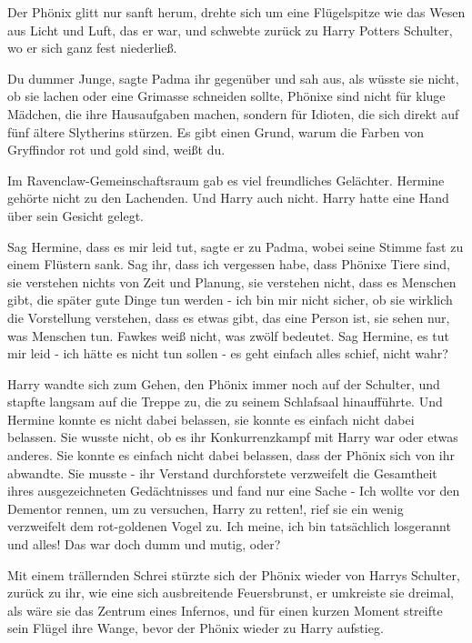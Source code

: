 Der Phönix glitt nur sanft herum, drehte sich um eine Flügelspitze wie das Wesen
aus Licht und Luft, das er war, und schwebte zurück zu Harry Potters Schulter,
wo er sich ganz fest niederließ.

\glqq{}Du dummer Junge\grqq{}, sagte Padma ihr gegenüber und sah aus, als wüsste
sie nicht, ob sie lachen oder eine Grimasse schneiden sollte, \glqq{}Phönixe sind
nicht für kluge Mädchen, die ihre Hausaufgaben machen, sondern für Idioten, die
sich direkt auf fünf ältere Slytherins stürzen. Es gibt einen Grund, warum die
Farben von Gryffindor rot und gold sind, weißt du.\grqq{}

Im Ravenclaw-Gemeinschaftsraum gab es viel freundliches Gelächter. Hermine
gehörte nicht zu den Lachenden. Und Harry auch nicht. Harry hatte eine Hand über
sein Gesicht gelegt.

\glqq{}Sag Hermine, dass es mir leid tut\grqq{}, sagte er zu Padma, wobei seine
Stimme fast zu einem Flüstern sank. \glqq{}Sag ihr, dass ich vergessen habe, dass
Phönixe Tiere sind, sie verstehen nichts von Zeit und Planung, sie verstehen
nicht, dass es Menschen gibt, die später gute Dinge tun werden - ich bin mir
nicht sicher, ob sie wirklich die Vorstellung verstehen, dass es etwas gibt, das
eine Person ist, sie sehen nur, was Menschen tun. Fawkes weiß nicht, was zwölf
bedeutet. Sag Hermine, es tut mir leid - ich hätte es nicht tun sollen - es geht
einfach alles schief, nicht wahr?\grqq{}

Harry wandte sich zum Gehen, den Phönix immer noch auf der Schulter, und stapfte
langsam auf die Treppe zu, die zu seinem Schlafsaal hinaufführte. Und Hermine
konnte es nicht dabei belassen, sie konnte es einfach nicht dabei belassen. Sie
wusste nicht, ob es ihr Konkurrenzkampf mit Harry war oder etwas anderes. Sie
konnte es einfach nicht dabei belassen, dass der Phönix sich von ihr abwandte.
Sie musste - ihr Verstand durchforstete verzweifelt die Gesamtheit ihres
ausgezeichneten Gedächtnisses und fand nur eine Sache - \glqq{}Ich wollte vor den
Dementor rennen, um zu versuchen, Harry zu retten!\grqq{}, rief sie ein wenig
verzweifelt dem rot-goldenen Vogel zu. \glqq{}Ich meine, ich bin tatsächlich
losgerannt und alles! Das war doch dumm und mutig, oder?\grqq{}

Mit einem trällernden Schrei stürzte sich der Phönix wieder von Harrys Schulter,
zurück zu ihr, wie eine sich ausbreitende Feuersbrunst, er umkreiste sie
dreimal, als wäre sie das Zentrum eines Infernos, und für einen kurzen Moment
streifte sein Flügel ihre Wange, bevor der Phönix wieder zu Harry aufstieg.


